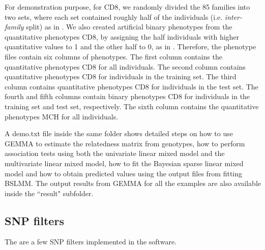 \documentclass[11pt]{article}
\begin{document}
For demonstration purpose, for CD8, we randomly divided the 85
families into two sets, where each set contained roughly half of the
individuals (i.e. {\it inter-family} split) as in \cite{Zhou:2013}. We
also created artificial binary phenotypes from the quantitative
phenotypes CD8, by assigning the half individuals with higher
quantitative values to 1 and the other half to 0, as in
\cite{Zhou:2013}. Therefore, the phenotype files contain six columns
of phenotypes. The first column contains the quantitative phenotypes
CD8 for all individuals. The second column contains quantitative
phenotypes CD8 for individuals in the training set. The third column
contains quantitative phenotypes CD8 for individuals in the test
set. The fourth and fifth columns contain binary phenotypes CD8 for
individuals in the training set and test set, respectively. The sixth
column contains the quantitative phenotypes MCH for all individuals.

A demo.txt file inside the same folder shows detailed steps on how to
use GEMMA to estimate the relatedness matrix from genotypes, how to
perform association tests using both the univariate linear mixed model
and the multivariate linear mixed model, how to fit the Bayesian
sparse linear mixed model and how to obtain predicted values using the
output files from fitting BSLMM. The output results from GEMMA for all
the examples are also available inside the ``result" subfolder.

\subsection{SNP filters}

The are a few SNP filters implemented in the software.
\end{document}
